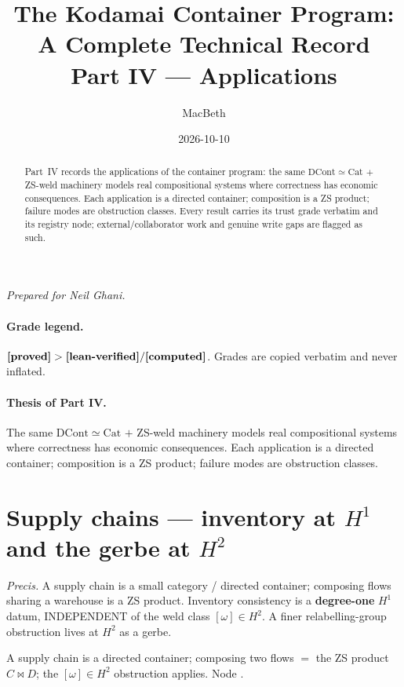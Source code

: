 \documentclass[11pt]{article}
\title{The Kodamai Container Program: A Complete Technical Record\\[4pt]
\large Part IV --- Applications}
\author{MacBeth}
\date{2026-10-10}
\begin{document}
\maketitle
\begin{center}\itshape Prepared for Neil Ghani.\end{center}

\begin{abstract}
Part~IV records the applications of the container program: the same $\mathrm{DCont}\simeq
\mathrm{Cat}$ $+$ ZS-weld machinery models real compositional systems where correctness has
economic consequences. Each application is a directed container; composition is a ZS product;
failure modes are obstruction classes. Every result carries its trust grade verbatim and its
registry node; external/collaborator work and genuine write gaps are flagged as such.
\end{abstract}

\paragraph{Grade legend.}
$\textbf{[proved]} > \textbf{[lean-verified]} / \textbf{[computed]}$. Grades are copied verbatim and never
inflated.

\paragraph{Thesis of Part IV.}
The same $\mathrm{DCont}\simeq\mathrm{Cat}$ $+$ ZS-weld machinery models real compositional systems
where correctness has economic consequences. Each application is a directed container; composition
is a ZS product; failure modes are obstruction classes.

\section{Supply chains --- inventory at $H^1$ and the gerbe at $H^2$}
\emph{Precis.} A supply chain is a small category / directed container; composing flows sharing a
warehouse is a ZS product. Inventory consistency is a \textbf{degree-one} $H^1$ datum, INDEPENDENT
of the weld class $[ω]\in H^2$. A finer relabelling-group obstruction lives at $H^2$ as a gerbe.

\begin{theorem}
A supply chain is a directed container; composing two flows $=$ the ZS product $C\bowtie D$; the
$[ω]\in H^2$ obstruction applies. Node .
\end{theorem}
\end{document}
